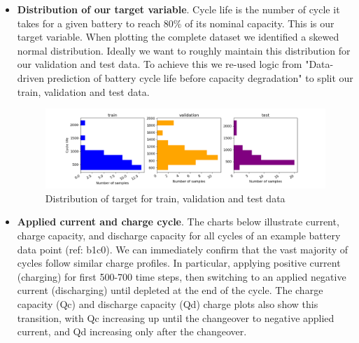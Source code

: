 \documentclass{article}
\begin{document}
\begin{itemize}
    \item \textbf{Distribution of our target variable}. Cycle life is the number of cycle it takes for a given battery to reach 80\% of its nominal capacity. This is our target variable. When plotting the complete dataset we identified a skewed normal distribution. Ideally we want to roughly maintain this distribution for our validation and test data. To achieve this we re-used logic from "Data-driven prediction of battery cycle life before capacity degradation" \cite{severson2019data} to split our train, validation and test data.

        \begin{figure}[H]
            \centering
            \includegraphics[scale=0.5] {figs/histogram_cycle_life_traintest.png}
            \caption{Distribution of target for train, validation and test data}
            \label{fig:1b}
        \end{figure}

    \item \textbf{Applied current and charge cycle}. The charts below illustrate current, charge capacity, and  discharge capacity for all cycles of an example battery data point (ref: b1c0). We can immediately confirm that the vast majority of cycles follow similar charge profiles. In particular, applying positive current (charging) for first 500-700 time steps, then switching to an applied negative current (discharging) until depleted at the end of the cycle. The charge capacity (Qc) and discharge capacity (Qd) charge plots also show this transition, with Qc increasing up until the changeover to negative applied current, and Qd increasing only after the changeover.


\end{itemize}
\end{document}
